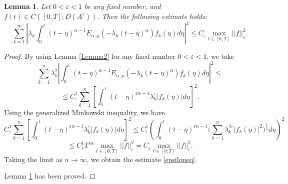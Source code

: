 \documentclass{amsart}
\numberwithin{equation}{section}
\newtheorem{lem}[thm]{Lemma}
\begin{document}
\begin{lem}\label{Lemma6}
Let $0<\varepsilon<1$ be any fixed number, and $f(t) \in C([0,T];D(A^\varepsilon))$. Then the following estimate holds:
\begin{equation}\label{epsiloneq}
  \sum_{k=1}^\infty \left| \lambda_k\int_0^t (t-\eta)^{\alpha-1} E_{\alpha,\mu}(-\lambda_k (t-\eta)^\alpha)f_k(\eta) d\eta\right|^2\leq C_\varepsilon \max_{t\in[0,T]}||f||_\varepsilon^2.
\end{equation}
\end{lem}
\begin{proof}
 By using Lemma \ref{Lemma2} for any fixed number $0<\varepsilon<1$, we take
$$
\sum_{k=1}^n \lambda_k^2 \left|\int_0^t (t-\eta)^{\alpha-1}E_{\alpha,\mu}(-\lambda_k (t-\eta)^\alpha)f_k(\eta) d\eta\right|^2\leq
$$
$$\leq C^1_\varepsilon\sum_{k=1}^n  \left[\int_0^t (t-\eta)^{\varepsilon\alpha-1}\lambda_k^\varepsilon |f_k(\eta)| d\eta\right]^2.$$
Using the generalized Minkowski inequality, we have
$$C^1_\varepsilon\sum_{k=1}^n  \left[\int_0^t (t-\eta)^{\varepsilon\alpha-1}\lambda_k^\varepsilon |f_k(\eta)| d\eta\right]^2\leq C^1_\varepsilon\left(\int_0^t (t-\eta)^{\varepsilon \alpha-1}\bigg(\sum_{k=1}^n \lambda_k^{2\varepsilon} |f_k(\eta)|^2\bigg)^{\frac{1}{2}} d\eta\right)^2
$$
$$
\leq C^1_\varepsilon T^{\varepsilon\alpha}\max_{t\in[0,T]} ||f||_\varepsilon^2=C_\varepsilon \max_{t \in[0;T]}||f||_\varepsilon^2.
$$
Taking the limit as $n \rightarrow \infty$, we obtain the estimate \eqref{epsiloneq}.

Lemma \ref{Lemma6} has been proved.
\end{proof}
\end{document}
